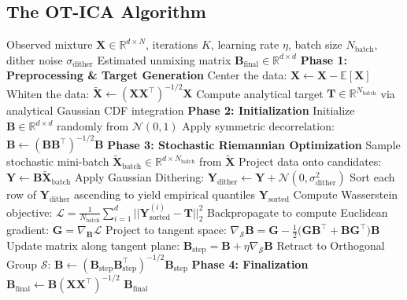 \documentclass{tpm2026} %
\begin{document}
\subsection{The OT-ICA Algorithm}
\begin{algorithm}[htbp]
\caption{The Optimal Transport ICA (OT-ICA) Algorithm}
\label{alg:ot_ica}
\begin{algorithmic}[1]
\Require Observed mixture $\mathbf{X} \in \mathbb{R}^{d \times N}$, iterations $K$, learning rate $\eta$, batch size $N_{\text{batch}}$, dither noise $\sigma_{\text{dither}}$
\Ensure Estimated unmixing matrix $\mathbf{B}_{\text{final}} \in \mathbb{R}^{d \times d}$
\State \textbf{Phase 1: Preprocessing \& Target Generation}
\State Center the data: $\mathbf{X} \gets \mathbf{X} - \mathbb{E}[\mathbf{X}]$
\State Whiten the data: $\widetilde{\mathbf{X}} \gets (\mathbf{X}\mathbf{X}^\top)^{-1/2} \mathbf{X}$
\State Compute analytical target $\mathbf{T} \in \mathbb{R}^{N_{\text{batch}}}$ via analytical Gaussian CDF integration
\State \textbf{Phase 2: Initialization}
\State Initialize $\mathbf{B} \in \mathbb{R}^{d \times d}$ randomly from $\mathcal{N}(0,1)$
\State Apply symmetric decorrelation: $\mathbf{B} \gets (\mathbf{B}\mathbf{B}^\top)^{-1/2} \mathbf{B}$
\State \textbf{Phase 3: Stochastic Riemannian Optimization}
    \State Sample stochastic mini-batch $\widetilde{\mathbf{X}}_{\text{batch}} \in \mathbb{R}^{d \times N_{\text{batch}}}$ from $\widetilde{\mathbf{X}}$
    \State Project data onto candidates: $\mathbf{Y} \gets \mathbf{B} \widetilde{\mathbf{X}}_{\text{batch}}$
    \State Apply Gaussian Dithering: $\mathbf{Y}_{\text{dither}} \gets \mathbf{Y} + \mathcal{N}(0, \sigma_{\text{dither}}^2)$
    \State Sort each row of $\mathbf{Y}_{\text{dither}}$ ascending to yield empirical quantiles $\mathbf{Y}_{\text{sorted}}$
    \State Compute Wasserstein objective: $\mathcal{L} = \frac{1}{N_{\text{batch}}} \sum_{i=1}^{d} ||\mathbf{Y}_{\text{sorted}}^{(i)} - \mathbf{T}||_2^2$
    \State Backpropagate to compute Euclidean gradient: $\mathbf{G} = \nabla_{\mathbf{B}} \mathcal{L}$
    \State Project to tangent space: $\nabla_{\mathcal{S}} \mathbf{B} = \mathbf{G} - \frac{1}{2}\big(\mathbf{G}\mathbf{B}^\top + \mathbf{B}\mathbf{G}^\top \big)\mathbf{B}$
    \State Update matrix along tangent plane: $\mathbf{B}_{\text{step}} = \mathbf{B} + \eta \nabla_{\mathcal{S}} \mathbf{B}$
    \State Retract to Orthogonal Group $\mathcal{S}$: $\mathbf{B} \gets (\mathbf{B}_{\text{step}}\mathbf{B}_{\text{step}}^\top)^{-1/2} \mathbf{B}_{\text{step}}$
\EndFor
\State \textbf{Phase 4: Finalization}
\State $\mathbf{B}_{\text{final}} \gets \mathbf{B} (\mathbf{X}\mathbf{X}^\top)^{-1/2}$ 
\State \Return $\mathbf{B}_{\text{final}}$
\end{algorithmic}
\end{algorithm}
\end{document}
